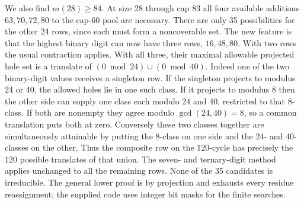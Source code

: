 We also find $m(28)\ge84$. At size 28 through cap 83 all four available additions $63,70,72,80$ to the cap-60 pool are necessary. There are only 35 possibilities for the other 24 rows, since each must form a noncoverable set. The new feature is that the highest binary digit can now have three rows, $16,48,80$. With two rows the usual contraction applies. With all three, their maximal allowable projected hole set is a translate of $(0\bmod24)\cup(0\bmod40)$. Indeed one of the two binary-digit values receives a singleton row. If the singleton projects to modulus 24 or 40, the allowed holes lie in one such class. If it projects to modulus 8 then the other side can supply one class each modulo 24 and 40, restricted to that 8-class. If both are nonempty they agree modulo $\gcd(24,40)=8$, so a common translation puts both at zero. Conversely these two classes together are simultaneously attainable by putting the 8-class on one side and the 24- and 40-classes on the other. Thus the composite row on the 120-cycle has precisely the 120 possible translates of that union. The seven- and ternary-digit method applies unchanged to all the remaining rows. None of the 35 candidates is irreducible. The general lower proof is by projection and exhausts every residue reassignment; the supplied code uses integer bit masks for the finite searches.
